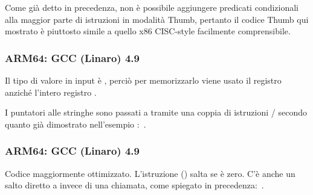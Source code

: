 
Come già detto in precedenza, non è possibile aggiungere predicati condizionali alla maggior parte di istruzioni in modalità
Thumb, pertanto il codice Thumb qui mostrato è piuttosto simile a quello x86 \ac{CISC}-style facilmente comprensibile.

\subsubsection{ARM64: \NonOptimizing GCC (Linaro) 4.9}



Il tipo di valore in input è \Tint, perciò per memorizzarlo viene usato il registro  anziché l'intero registro .

I puntatori alle stringhe sono passati a \puts tramite una coppia di istruzioni / secondo quanto già dimostrato
nell'esempio \q{\HelloWorldSectionName}:~.

\subsubsection{ARM64: \Optimizing GCC (Linaro) 4.9}



Codice maggiormente ottimizzato.
L'istruzione  () salta se  è zero.
C'è anche un salto diretto a \puts invece di una chiamata, come spiegato in precedenza:~.


